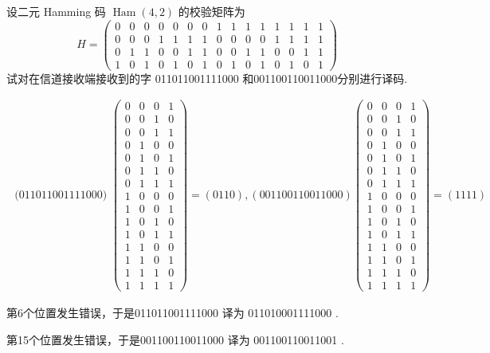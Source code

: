   \begin{tcolorbox}[breakable,colback=blue!5!white,colframe=blue!75!black,
 title= 解答题]

 设二元 Hamming 码 $ \operatorname{Ham}(4,2) $ 的校验矩阵为
$$
H=\left(\begin{array}{lllllllllllllll}
0 & 0 & 0 & 0 & 0 & 0 & 0 & 1 & 1 & 1 & 1 & 1 & 1 & 1 & 1 \\
0 & 0 & 0 & 1 & 1 & 1 & 1 & 0 & 0 & 0 & 0 & 1 & 1 & 1 & 1 \\
0 & 1 & 1 & 0 & 0 & 1 & 1 & 0 & 0 & 1 & 1 & 0 & 0 & 1 & 1 \\
1 & 0 & 1 & 0 & 1 & 0 & 1 & 0 & 1 & 0 & 1 & 0 & 1 & 0 & 1
\end{array}\right)
$$
试对在信道接收端接收到的字 011011001111000 和001100110011000分别进行译码.

 \tcblower
    $$\begin{array}{c}
\text { (011011001111000) }\left(\begin{array}{cccc}
0 & 0 & 0 & 1 \\
0 & 0 & 1 & 0 \\
0 & 0 & 1 & 1 \\
0 & 1 & 0 & 0 \\
0 & 1 & 0 & 1 \\
0 & 1 & 1 & 0 \\
0 & 1 & 1 & 1 \\
1 & 0 & 0 & 0 \\
1 & 0 & 0 & 1 \\
1 & 0 & 1 & 0 \\
1 & 0 & 1 & 1 \\
1 & 1 & 0 & 0 \\
1 & 1 & 0 & 1 \\
1 & 1 & 1 & 0 \\
1 & 1 & 1 & 1
\end{array}\right)=(0110), (001100110011000)\left(\begin{array}{llll}
0 & 0 & 0 & 1 \\
0 & 0 & 1 & 0 \\
0 & 0 & 1 & 1 \\
0 & 1 & 0 & 0 \\
0 & 1 & 0 & 1 \\
0 & 1 & 1 & 0 \\
0 & 1 & 1 & 1 \\
1 & 0 & 0 & 0 \\
1 & 0 & 0 & 1 \\
1 & 0 & 1 & 0 \\
1 & 0 & 1 & 1 \\
1 & 1 & 0 & 0 \\
1 & 1 & 0 & 1 \\
1 & 1 & 1 & 0 \\
1 & 1 & 1 & 1
\end{array}\right)=(1111)
\end{array}
$$

第6个位置发生错误，于是011011001111000 译为 011010001111000 .

第15个位置发生错误，于是001100110011000 译为 001100110011001 .

 \end{tcolorbox}



